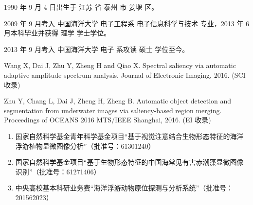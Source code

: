 \begin{resume}


  1990 年 9 月 4 日出生于 江苏 省 泰州 市 姜堰 区。
  
  2009 年 9 月考入 中国海洋大学 电子工程系 电子信息科学与技术 专业，2013 年 6 月本科毕业并获得 理学 学士学位。
  
  2013 年 9 月考入 中国海洋大学 电子 系攻读 硕士 学位至今。

     
  \begin{enumerate}[{[}1{]}]
  \item Wang X, Dai J, Zhu Y, Zheng H and Qiao X. Spectral saliency via automatic adaptive amplitude spectrum analysis. Journal of Electronic Imaging, 2016. (SCI 收录)
  \item Zhu Y, Chang L, Dai J, Zheng H, Zheng B. Automatic object detection and segmentation from underwater images via saliency-based region merging. Proceedings of OCEANS 2016 MTS/IEEE Shanghai, 2016. (EI 收录)
  \end{enumerate}

  \begin{enumerate}
  \item 国家自然科学基金青年科学基金项目“基于视觉注意结合生物形态特征的海洋浮游植物显微图像分析”（批准号：61301240）
  \item 国家自然科学基金项目“基于生物形态特征的中国海常见有害赤潮藻显微图像识别”（批准号：61271406）
  \item 中央高校基本科研业务费“海洋浮游动物原位探测与分析系统”（批准号：201562023）
  \end{enumerate}
  
\end{resume}

